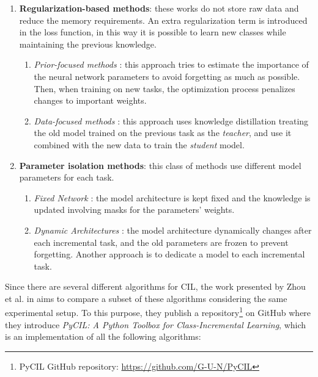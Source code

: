 \begin{enumerate}
    \item \textbf{Regularization-based methods}: these works do not store raw data and reduce the memory requirements. An extra regularization term is introduced in the loss function, in this way it is possible to learn new classes while maintaining the previous knowledge.
    \begin{enumerate}
        \item \textit{Prior-focused methods} \cite{kirkpatrick2017overcoming, lee2017overcoming, zenke2017continual, liu2018rotate, aljundi2018memory, chaudhry2018riemannian}: this approach tries to estimate the importance of the neural network parameters to avoid forgetting as much as possible. Then, when training on new tasks, the optimization process penalizes changes to important weights.
        \item \textit{Data-focused methods} \cite{li2017learning, jung2016less, zhang2020class, rannen2017encoder}: this approach uses knowledge distillation \cite{hinton2015distilling} treating the old model trained on the previous task as the \textit{teacher}, and use it combined with the new data to train the \textit{student} model.
    \end{enumerate}
    \item \textbf{Parameter isolation methods}: this class of methods use different model parameters for each task.
    \begin{enumerate}
        \item \textit{Fixed Network} \cite{mallya2018packnet, mallya2018piggyback, serra2018overcoming, fernando2017pathnet}: the model architecture is kept fixed and the knowledge is updated involving masks for the parameters' weights.
        \item \textit{Dynamic Architectures} \cite{rusu2016progressive, xu2018reinforced, aljundi2017expert, rosenfeld2018incremental}: the model architecture dynamically changes after each incremental task, and the old parameters are frozen to prevent forgetting. Another approach is to dedicate a model to each incremental task.
    \end{enumerate}
\end{enumerate}

Since there are several different algorithms for CIL, the work presented by Zhou et al. in \cite{zhou2021pycil} aims to compare a subset of these algorithms considering the same experimental setup. To this purpose, they publish a repository\footnote{PyCIL GitHub repository: \href{https://github.com/G-U-N/PyCIL}{https://github.com/G-U-N/PyCIL}}
on GitHub where they introduce \textit{PyCIL: A Python Toolbox for Class-Incremental Learning}, which is an implementation of all the following algorithms:

